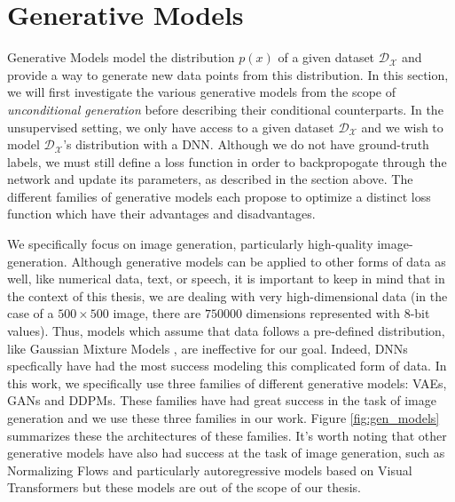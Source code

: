 \section{Generative Models}

Generative Models model the distribution $p(x)$ of a given dataset $\mathcal{D}_{\mathcal{X}}$ and provide a 
way to generate new data points from this distribution. In this section, we will first investigate 
the various generative models from the scope of \emph{unconditional generation} before describing their 
conditional counterparts. In the unsupervised setting, we only have access to a 
given  dataset $\mathcal{D}_{\mathcal{X}}$ and we wish to model $\mathcal{D}_{\mathcal{X}}$'s distribution with a 
\ac{DNN}. Although we do not have ground-truth labels, we must still define a loss function in order to 
backpropogate through the network and update its parameters, as described in the section above. The 
different families of generative models each propose to optimize a distinct loss function which 
have their advantages and disadvantages. 

We specifically focus on image generation, particularly high-quality
image-generation. Although generative models can be applied to other forms of data as well, like 
numerical data, text, or speech, it is important to keep in mind that in the context of this thesis, 
we are dealing with very high-dimensional data (in the case 
of a $500\times500$ image, there are $750000$ dimensions represented with 8-bit values). Thus, models which assume 
that data follows a pre-defined distribution, like Gaussian Mixture Models 
\citep{em_algoo}, are 
ineffective for our goal. Indeed, \ac{DNN}s specfically have had the most success modeling 
this complicated form of data. In this work, we specifically use three families of different generative models:
\ac{VAE}s, \ac{GAN}s and \ac{DDPM}s. These families have had great success in the task of 
image generation and we use these three families in our work. Figure \ref{fig:gen_models}
summarizes these the architectures of these families. It's worth noting that other generative models have also had 
success at the task of image generation, such as Normalizing Flows \citep{rezende2015variational, dinh2014nice}
 and particularly autoregressive models based on Visual Transformers \citep{esser2021taming, ramesh2021zero, ding2021cogview, gafni2022make, yu2022scaling}
but these models are out of the scope of our thesis. 

